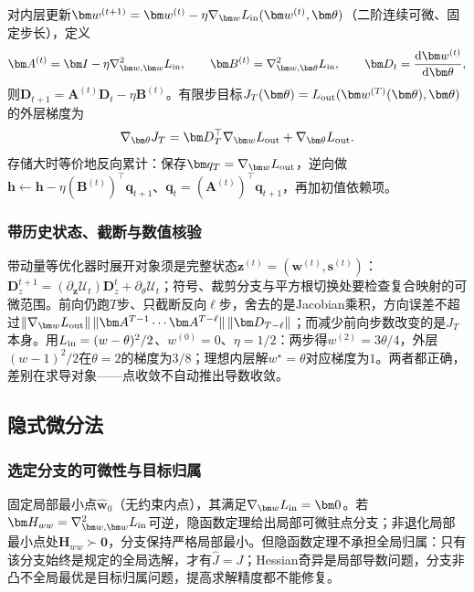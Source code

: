 对内层更新$\bm w^{(t+1)}=\bm w^{(t)}-\eta\nabla_{\bm w}L_{\rm in}(\bm w^{(t)},\bm\theta)$（二阶连续可微、固定步长），定义
\[
 \bm A^{(t)}=\bm I-\eta\nabla_{\bm w,\bm w}^2L_{\rm in},\qquad
 \bm B^{(t)}=\nabla_{\bm w,\bm\theta}^2L_{\rm in},
 \qquad
 \bm D_t=\frac{\mathrm d\bm w^{(t)}}{\mathrm d\bm\theta},
\]
则$\bm D_{t+1}=\bm A^{(t)}\bm D_t-\eta\bm B^{(t)}$。有限步目标$J_T(\bm\theta)=L_{\rm out}(\bm w^{(T)}(\bm\theta),\bm\theta)$的外层梯度为
\[
 \nabla_{\bm\theta}J_T
 =\bm D_T^\top\nabla_{\bm w}L_{\rm out}
 +\nabla_{\bm\theta}L_{\rm out}.
\]
存储大时等价地反向累计：保存$\bm q_T=\nabla_{\bm w}L_{\rm out}$，逆向做$\bm h\leftarrow\bm h-\eta(\bm B^{(t)})^\top\bm q_{t+1}$、$\bm q_t=(\bm A^{(t)})^\top\bm q_{t+1}$，再加初值依赖项。

\subsubsection{带历史状态、截断与数值核验}

带动量等优化器时展开对象须是完整状态$\bm z^{(t)}=(\bm w^{(t)},\bm s^{(t)})$：$\bm D_z^{t+1}=(\partial_{\bm z}\mathcal U_t)\bm D_z^t+\partial_\theta\mathcal U_t$；符号、裁剪分支与平方根切换处要检查复合映射的可微范围。前向仍跑$T$步、只截断反向$\ell$步，舍去的是Jacobian乘积，方向误差不超过$\|\nabla_{\bm w}L_{\rm out}\|\,\|\bm A^{T-1}\cdots\bm A^{T-\ell}\|\,\|\bm D_{T-\ell}\|$；而减少前向步数改变的是$J_T$本身。用$L_{\rm in}=(w-\theta)^2/2$、$w^{(0)}=0$、$\eta=1/2$：两步得$w^{(2)}=3\theta/4$，外层$(w-1)^2/2$在$\theta=2$的梯度为$3/8$；理想内层解$w^\star=\theta$对应梯度为$1$。两者都正确，差别在求导对象——点收敛不自动推出导数收敛。

\subsection{隐式微分法}

\subsubsection{选定分支的可微性与目标归属}

固定局部最小点$\widehat{\bm w}_0$（无约束内点），其满足$\nabla_{\bm w}L_{\rm in}=\bm0$。若$\bm H_{ww}=\nabla_{\bm w,\bm w}^2L_{\rm in}$可逆，隐函数定理给出局部可微驻点分支；非退化局部最小点处$\bm H_{ww}\succ\bm0$，分支保持严格局部最小。但隐函数定理不承担全局归属：只有该分支始终是规定的全局选解，才有$\widehat J=J$；Hessian奇异是局部导数问题，分支非凸不全局最优是目标归属问题，提高求解精度都不能修复。

